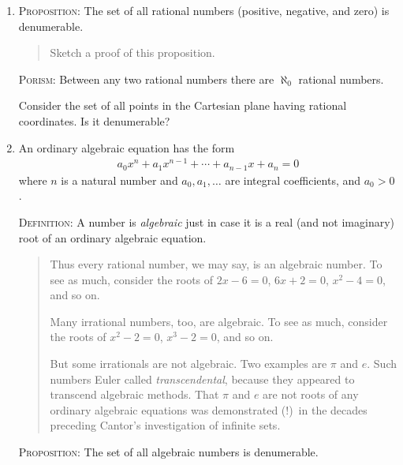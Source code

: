 \documentclass[twoside,openright]{article}
\begin{document}
\begin{enumerate}
\begin{enumerate}[(1)]
\begin{align*}
      1,  2,  \tfrac{1}{2}, \tfrac{1}{3}, 3, 4, \tfrac{3}{2},
      \tfrac{2}{3}, \tfrac{1}{4}, \ldots.
    \end{align*}
  \item There is a 1--1 correspondence between all these rationals and
    the natural numbers.
  \item Therefore, the set of all rationals $>0$ has the same
    cardinality as the set of all natural numbers.
  \item Therefore, the set of all rationals $>0$ is denumerable.
  \end{enumerate}
\item \textsc{Proposition}\label{ratden}: The set of all rational
  numbers (positive, negative, and zero) is denumerable.
  \begin{quotation} {\small Sketch a proof of this proposition.
    }\end{quotation}
  \textsc{Porism}: Between any two rational numbers there are
  $\aleph_0$ rational numbers.

  Consider the set of all points in the Cartesian plane having
  rational coordinates. Is it denumerable?\label{rationalcoordinates}
\item An ordinary algebraic equation has the form
  \begin{align*}
    a_0x^n+a_1x^{n-1}+\dotsb+a_{n-1}x+a_n=0
  \end{align*}
  where $n$ is a natural number and $a_0, a_1, \dotsc$ are integral
  coefficients, and $a_0>0$.

  \textsc{Definition}: A number is \emph{algebraic} just in case it is
  a real (and not imaginary) root of an ordinary algebraic equation.
\begin{quote}
{\small Thus every rational number, we may say, is an algebraic number. To see as much, consider the roots of $2x-6=0$, $6x+2=0$, $x^2-4=0$, and so on.

Many irrational numbers, too, are algebraic. To see as much, consider the roots of $x^2-2=0$,  $x^3-2=0$, and so on.

But some irrationals are not algebraic. Two examples are $\pi$ and
$e$. Such numbers Euler called \emph{transcendental}, because they
appeared to transcend algebraic methods. That $\pi$ and $e$ are not
roots of any ordinary algebraic equations was demonstrated (!)\ in the
decades preceding Cantor's investigation of infinite sets.}
\end{quote}
\textsc{Proposition}: The set of all algebraic numbers is
denumerable.\label{algden}


\end{enumerate}
\end{document}
